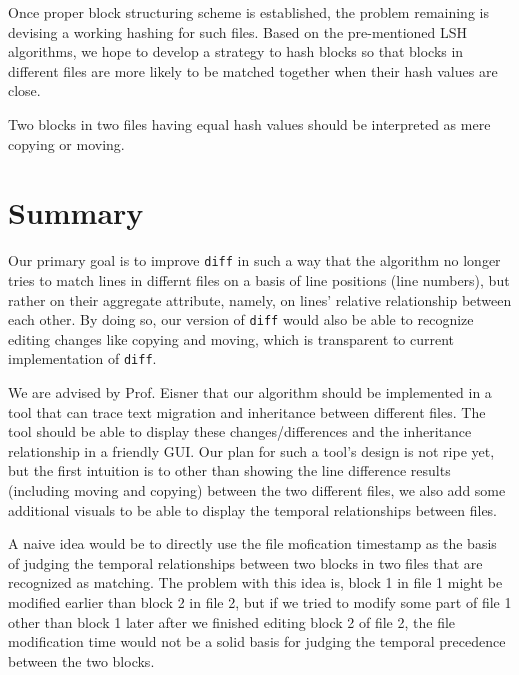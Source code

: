 \documentclass{article}
\begin{document}
Once proper block structuring scheme is established, the problem remaining is devising a working hashing for such files.
Based on the pre-mentioned LSH algorithms, we hope to develop a strategy to hash blocks so that blocks in different files are more likely to be matched together when their hash values are close.

Two blocks in two files having equal hash values should be interpreted as mere copying or moving. 

\section{Summary}
Our primary goal is to improve \texttt{diff} in such a way that the algorithm no longer tries to match lines in differnt files on a basis of line positions (line numbers), but rather on their aggregate attribute, namely, on lines' relative relationship between each other. By doing so, our version of \texttt{diff} would also be able to recognize editing changes like copying and moving, which is transparent to current implementation of \texttt{diff}.

We are advised by Prof. Eisner that our algorithm should be implemented in a tool that can trace text migration and inheritance between different files. The tool should be able to display these changes/differences and the inheritance relationship in a friendly GUI. Our plan for such a tool's design is not ripe yet, but the first intuition is to other than showing the line difference results (including moving and copying) between the two different files, we also add some additional visuals to be able to display the temporal relationships between files. 

A naive idea would be to directly use the file mofication timestamp as the basis of judging the temporal relationships between two blocks in two files that are recognized as matching.
The problem with this idea is, block 1 in file 1 might be modified earlier than block 2 in file 2, but if we tried to modify some part of file 1 other than block 1 later after we finished editing block 2 of file 2, the file modification time would not be a solid basis for judging the temporal precedence between the two blocks.
\end{document}
